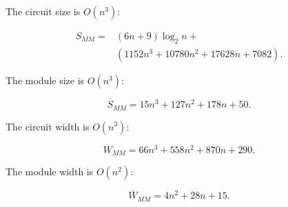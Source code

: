 The circuit size is $O(n^3)$:

\begin{eqnarray}
S_{MM} = & (6n + 9)\log_2 n +\\
        & (1152n^3 + 10780n^2 + 17628n + 7082)\text{.}
\end{eqnarray}

The module size is $O(n^3)$:

\begin{equation}
\overline{S}_{MM} = 15n^3 + 127n^2 + 178n + 50{.}
\end{equation}

The circuit width is $O(n^3)$:

\begin{equation}
W_{MM} = 66n^3 + 558n^2 + 870n + 290\text{.}
\end{equation}

The module width is $O(n^2)$:

\begin{equation}
\overline{W}_{MM} = 4n^2 + 28n + 15\text{.}
\end{equation}